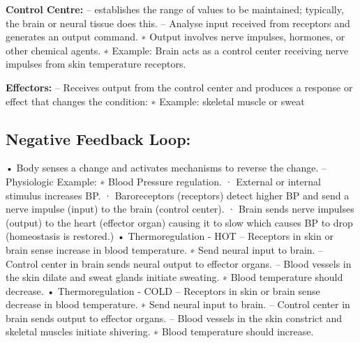 \documentclass[12pt]{article}
\begin{document}
\item\textbf{Control Centre:}
\newline– establishes the range of values to be maintained; typically, the brain or neural tissue does this.
\newline– Analyse input received from receptors and generates an output
command.
\newline∗ Output involves nerve impulses, hormones, or other chemical
agents.
\newline∗ Example: Brain acts as a control center receiving nerve impulses
from skin temperature receptors.
\item\textbf{Effectors:}
\newline– Receives output from the control center and produces a response or
effect that changes the condition:
\newline∗ Example: skeletal muscle or sweat
\subsection{Negative Feedback Loop:}
\newline• Body senses a change and activates mechanisms to reverse the change.
\newline– Physiologic Example:
\newline∗ Blood Pressure regulation.
\newline· External or internal stimulus increases BP.
\newline· Baroreceptors (receptors) detect higher BP and send a nerve
impulse (input) to the brain (control center).
\newline· Brain sends nerve impulses (output) to the heart (effector organ) causing it to slow which causes BP to drop (homeostasis
is restored.)
\newline• Thermoregulation - HOT
\newline– Receptors in skin or brain sense increase in blood temperature.
\newline∗ Send neural input to brain.
\newline– Control center in brain sends neural output to effector organs.
\newline– Blood vessels in the skin dilate and sweat glands initiate sweating.
\newline∗ Blood temperature should decrease.
\newline• Thermoregulation - COLD
\newline– Receptors in skin or brain sense decrease in blood temperature.
\newline∗ Send neural input to brain.
\newline– Control center in brain sends output to effector organs.
\newline– Blood vessels in the skin constrict and skeletal muscles initiate shivering.
\newline∗ Blood temperature should increase.
\end{document}
